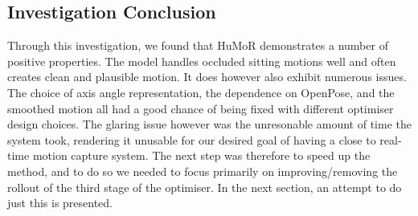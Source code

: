 \subsection{Investigation Conclusion}
Through this investigation, we found that HuMoR demonstrates a number of positive properties. The model handles occluded sitting motions well and often creates clean and plausible motion. It does however also exhibit numerous issues. The choice of axis angle representation, the dependence on OpenPose, and the smoothed motion all had a good chance of being fixed with different optimiser design choices.  The glaring issue however was the unresonable amount of time the system took, rendering it unusable for our desired goal of having a close to real-time motion capture system. The next step was therefore to speed up the method, and to do so we needed to focus primarily on improving/removing the rollout of the third stage of the optimiser. In the next section, an attempt to do just this is presented.